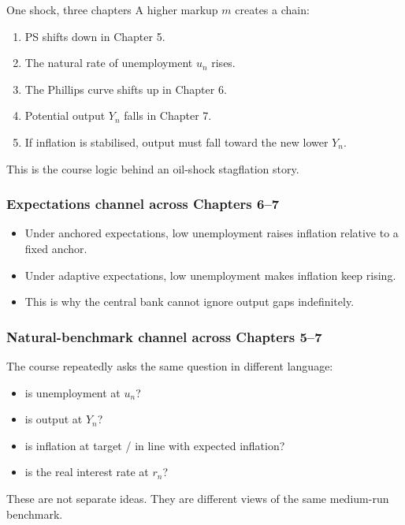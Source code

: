 \documentclass[12pt]{article}
\begin{document}
\begin{theorem}{One shock, three chapters}{}
A higher markup \(m\) creates a chain:
\begin{enumerate}[leftmargin=1.5em]
\item PS shifts down in Chapter 5.
\item The natural rate of unemployment \(u_n\) rises.
\item The Phillips curve shifts up in Chapter 6.
\item Potential output \(Y_n\) falls in Chapter 7.
\item If inflation is stabilised, output must fall toward the new lower \(Y_n\).
\end{enumerate}
This is the course logic behind an oil-shock stagflation story.
\end{theorem}

\subsubsection*{Expectations channel across Chapters 6--7}

\begin{itemize}[leftmargin=1.5em]
\item Under anchored expectations, low unemployment raises inflation relative to a fixed anchor.
\item Under adaptive expectations, low unemployment makes inflation keep rising.
\item This is why the central bank cannot ignore output gaps indefinitely.
\end{itemize}

\subsubsection*{Natural-benchmark channel across Chapters 5--7}

The course repeatedly asks the same question in different language:
\begin{itemize}[leftmargin=1.5em]
\item is unemployment at \(u_n\)?
\item is output at \(Y_n\)?
\item is inflation at target / in line with expected inflation?
\item is the real interest rate at \(r_n\)?
\end{itemize}
These are not separate ideas. They are different views of the same medium-run benchmark.
\end{document}
